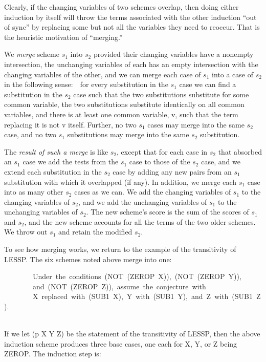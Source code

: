 \documentclass[10pt]{book}
\newenvironment{pubasis}{\begin{flushleft}}{\end{flushleft}}
\begin{document}
Clearly, if the changing variables of two
schemes overlap, then doing either induction by itself will throw the
terms associated with the other induction ``out of sync'' by replacing some
but not all the variables they need to reoccur.
That is the heuristic motivation of ``merging.''

We \emph{merge} scheme $s_{1}$ into $s_{2}$ provided their changing variables have a nonempty intersection,
the unchanging variables of each has an empty intersection with the changing variables of
the other, and we can merge each case of $s_{1}$ into a case of $s_{2}$
in the following sense:~~for every substitution in the $s_{1}$ case we can
find a substitution in the $s_{2}$ case such that the two substitutions
substitute for some common variable, the two substitutions substitute
identically on all common variables, and there is at least one common
variable, v, such that the term replacing it is not v itself.
Further, no two $s_{1}$ cases may merge
into the same $s_{2}$ case, and no two $s_{1}$ substitutions may merge
into the same $s_{2}$ substitution.

The \emph{result of such a merge} is like $s_{2}$, except that for each case
in $s_{2}$ that absorbed an $s_{1}$ case we add the tests from the $s_{1}$ case
to those of the $s_{2}$ case, and we extend each substitution in the $s_{2}$
case by adding  any new pairs from an $s_{1}$ substitution with which it overlapped (if any).
In addition, we merge each $s_{1}$ case into as many other $s_{2}$ cases
as we can.  We add the changing variables of $s_{1}$ to the changing variables of
$s_{2}$, and we add the unchanging variables of $s_{1}$ to the unchanging variables of
$s_{2}$.  The new scheme's score is
the sum of the scores of $s_{1}$ and $s_{2}$, and the new scheme
accounts for all the terms of the two older schemes.  We throw out $s_{1}$ and
retain the modified $s_{2}$.

To see how merging works, we  return to the example of
the transitivity of LESSP.  The six schemes noted above merge into one:

\begin{pubasis}
~~~~~~~~Under~the~conditions~(NOT~(ZEROP~X)),~(NOT~(ZEROP~Y)),\\
~~~~~~~~and~(NOT~(ZEROP~Z)),~assume~the~conjecture~with\\
~~~~~~~~X~replaced~with~(SUB1~X),~Y~with~(SUB1~Y),~and~Z~with~(SUB1~Z).\\
~\\
\end{pubasis}
If we let (p X Y Z) be the statement of the transitivity of LESSP, then
the above induction scheme  produces three base cases, one each for
X, Y, or Z being ZEROP.  The induction step is:
\end{document}
